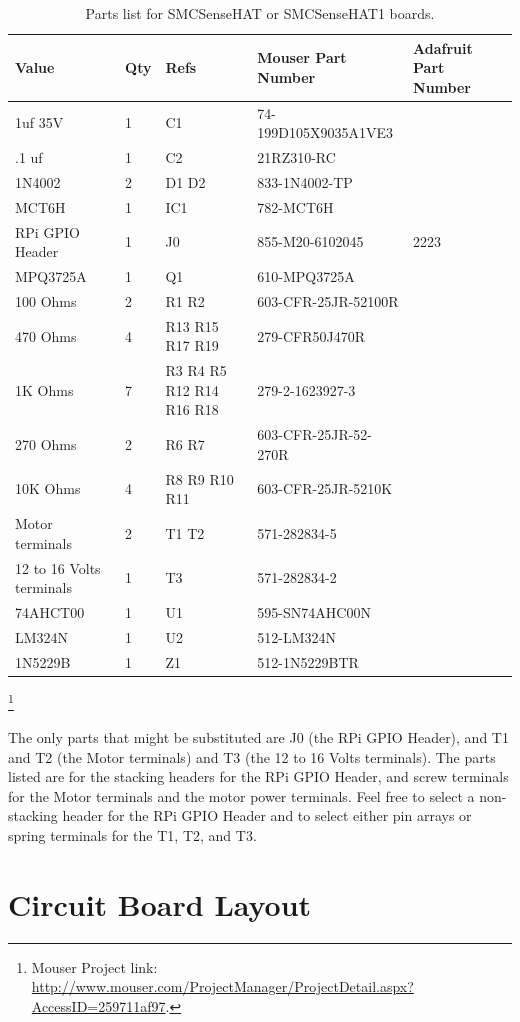 \begin{table}[htdp]
\begin{centering}\begin{tabular}{|l|l|p{1in}|l|p{.5in}|}
\hline
Value&Qty&Refs&Mouser Part Number&Adafruit Part Number \\
\hline
1uf 35V&1&C1&74-199D105X9035A1VE3& \\
\hline
.1 uf&1&C2&21RZ310-RC& \\
\hline
1N4002&2&D1 D2&833-1N4002-TP& \\
\hline
MCT6H&1&IC1&782-MCT6H& \\
\hline
RPi GPIO Header&1&J0&855-M20-6102045&2223 \\
\hline
MPQ3725A&1&Q1&610-MPQ3725A& \\
\hline
100 Ohms&2&R1 R2&603-CFR-25JR-52100R& \\
\hline
470 Ohms&4&R13 R15 R17 R19&279-CFR50J470R& \\
\hline
1K Ohms&7&R3 R4 R5 R12 R14 R16 R18&279-2-1623927-3& \\
\hline
270 Ohms&2&R6 R7&603-CFR-25JR-52-270R& \\
\hline
10K Ohms&4&R8 R9 R10 R11&603-CFR-25JR-5210K& \\
\hline
Motor terminals&2&T1 T2&571-282834-5& \\
\hline
12 to 16 Volts terminals&1&T3&571-282834-2& \\
\hline
74AHCT00&1&U1&595-SN74AHC00N& \\
\hline
LM324N&1&U2&512-LM324N& \\
\hline
1N5229B&1&Z1&512-1N5229BTR& \\
\hline
\end{tabular}
\caption{Parts list for SMCSenseHAT or SMCSenseHAT1 boards.}
\end{centering}\end{table}\footnote{Mouser Project link: 
\url{http://www.mouser.com/ProjectManager/ProjectDetail.aspx?AccessID=259711af97}.}


The only parts that might be substituted are J0 (the RPi GPIO Header), and T1 
and T2 (the Motor terminals) and T3 (the 12 to 16 Volts terminals).  The parts 
listed are for the stacking headers for the RPi GPIO Header, and screw 
terminals for the Motor terminals and the motor power terminals.  Feel free to 
select a non-stacking header for the RPi GPIO Header and to select either pin 
arrays or spring terminals for the T1, T2, and T3.


\section{Circuit Board Layout}

